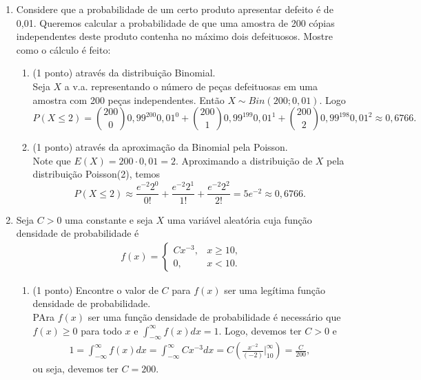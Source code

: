 \documentclass{article}
\begin{document}
\begin{enumerate}
\item Considere que a probabilidade de um certo produto apresentar defeito é de 0,01. Queremos calcular a probabilidade de que uma amostra de 200 cópias independentes deste produto contenha no máximo dois defeituosos. Mostre como o cálculo é feito:
\begin{enumerate}
	\item (1 ponto) através da distribuição Binomial.\\{\color{blue}  
	Seja $X$ a v.a. representando o número de peças defeituosas em uma amostra com 200 peças independentes. Então $X \sim Bin(200; 0,01)$. Logo
	$$
	P(X \leq 2) = \binom{200}{0}0,99^{200}0,01^{0} + \binom{200}{1}0,99^{199}0,01^{1} + \binom{200}{2}0,99^{198}0,01^{2}
	\approx 0,6766.
	$$
	}
	
	\item (1 ponto) através da aproximação da Binomial pela Poisson.\\{\color{blue}  
	Note que $E(X) = 200 \cdot 0,01 = 2$. Aproximando a distribuição de $X$ pela distribuição Poisson(2), temos
	$$
	P(X\leq 2) \approx \frac{e^{-2}2^0}{0!} + \frac{e^{-2}2^1}{1!} + \frac{e^{-2}2^2}{2!} = 5 e^{-2} \approx 0,6766.
	$$
	}
\end{enumerate}


\item Seja $C > 0$ uma constante e seja $X$ uma variável aleatória cuja função densidade de probabilidade é 
\begin{align*}
f(x) = \begin{cases}
C x^{-3}, & x \geq 10, \\
0, & x < 10.
\end{cases}
\end{align*}
\begin{enumerate}
	\item (1 ponto) Encontre o valor de $C$ para $f(x)$ ser uma legítima função densidade de probabilidade.\\{\color{blue}  
	PAra $f(x)$ ser uma função densidade de probabilidade é necessário que $f(x)\geq 0$ para todo $x$ e $\int_{-\infty}^{\infty} f(x) dx = 1$. Logo, devemos ter $C>0$ e
	\begin{align*}
	1 = \int_{-\infty}^{\infty} f(x) dx = \int_{-\infty}^{\infty} C x^{-3} dx = C\left( \frac{x^{-2}}{(-2)} \Big|_{10}^{\infty} \right) = \frac{C}{200},
	\end{align*}
	ou seja, devemos ter $C=200$.	
	}


\end{enumerate}
\end{enumerate}
\end{document}
